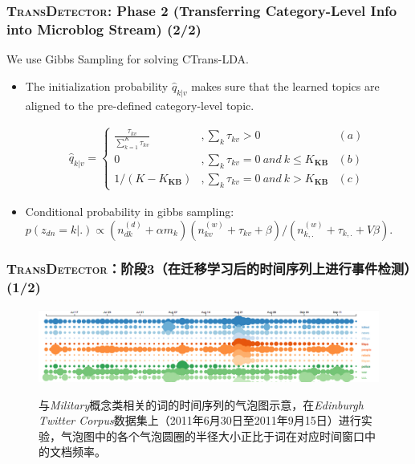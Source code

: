 \begin{frame}
\frametitle{\textsc{TransDetector}: Phase 2 (Transferring Category-Level Info into Microblog Stream) (2/2)}	
We use Gibbs Sampling for solving CTrans-LDA.
\begin{itemize}
	\item The initialization probability \(\hat{q}_{k|v}\) makes sure that the learned topics are aligned to the pre-defined category-level topic.
\setlength{\abovedisplayskip}{0pt}
\setlength{\belowdisplayskip}{0pt}
\begin{scriptsize} 
\begin{equation}
\label{eq:initProbability}
\begin{aligned}
\hat{q}_{k|v}=
\left\{ \begin{aligned}
\frac{\tau_{kv}}{\sum_{k=1}^{K}\tau_{kv}} &,\sum_{k}\tau_{kv}>0 & (a)\\
0&, \sum_{k}\tau_{kv}=0 \ and \ k \leq K_{\bm{KB}} & (b)\\
1/(K-K_{\bm{KB}})&,\sum_{k}\tau_{kv}=0 \ and \ k > K_{\bm{KB}} & (c)
\end{aligned}\right.
\end{aligned}
\end{equation}
\end{scriptsize}
\item Conditional probability in gibbs sampling:
\(p(z_{dn}=k|.)\propto (n^{(d)}_{dk}+\alpha m_k)(n^{(w)}_{kv}+\tau_{kv}+\beta)/(n^{(w)}_{k,.}+\tau_{k,.}+V\beta)\).
\end{itemize}

\end{frame}




\begin{frame}
\frametitle{\textsc{TransDetector}：阶段3（在迁移学习后的时间序列上进行事件检测）(1/2)}	
\begin{figure}[h]
		\setlength{\abovecaptionskip}{0.cm}
        \setlength{\belowcaptionskip}{0.cm}
        \centering
        \caption{与\textit{Military}概念类相关的词的时间序列的气泡图示意，在\textit{Edinburgh Twitter Corpus}数据集上（2011年6月30日至2011年9月15日）进行实验，气泡图中的各个气泡圆圈的半径大小正比于词在对应时间窗口中的文档频率。}
        \includegraphics[width=.99\columnwidth]{img/screenShot.png}
        \label{fig:hood}
\end{figure}
\end{frame}

